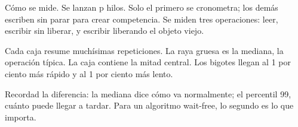 Cómo se mide. Se lanzan p hilos. Solo el primero se cronometra; los demás escriben sin parar para crear competencia. Se miden tres operaciones: leer, escribir sin liberar, y escribir liberando el objeto viejo.

Cada caja resume muchísimas repeticiones. La raya gruesa es la mediana, la operación típica. La caja contiene la mitad central. Los bigotes llegan al 1 por ciento más rápido y al 1 por ciento más lento.

Recordad la diferencia: la mediana dice cómo va normalmente; el percentil 99, cuánto puede llegar a tardar. Para un algoritmo wait-free, lo segundo es lo que importa.
